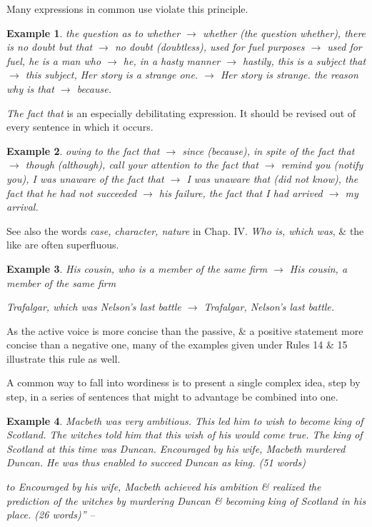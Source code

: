 \documentclass{article}
\newtheorem{example}{Example}
\begin{document}
Many expressions in common use violate this principle.
\begin{example}
	the question as to whether $\to$ whether (the question whether), there is no doubt but that $\to$ no doubt (doubtless), used for fuel purposes $\to$ used for fuel, he is a man who $\to$ he, in a hasty manner $\to$ hastily, this is a subject that $\to$ this subject, Her story is a strange one. $\to$ Her story is strange. the reason why is that $\to$ because.
\end{example}
{\it The fact that} is an especially debilitating expression. It should be revised out of every sentence in which it occurs.
\begin{example}
	owing to the fact that $\to$ since (because), in spite of the fact that $\to$ though (although), call your attention to the fact that $\to$ remind you (notify you), I was unaware of the fact that $\to$ I was unaware that (did not know), the fact that he had not succeeded $\to$ his failure, the fact that I had arrived $\to$ my arrival.
\end{example}
See also the words {\it case, character, nature} in Chap. IV. {\it Who is, which was}, \&  the like are often superfluous.
\begin{example}
	His cousin, who is a member of the same firm $\to$ His cousin, a member of the same firm
	
	Trafalgar, which was Nelson's last battle $\to$ Trafalgar, Nelson’s last battle.
\end{example}
As the active voice is more concise than the passive, \&  a positive statement more concise than a negative one, many of the examples given under Rules 14 \&  15 illustrate this rule as well.

A common way to fall into wordiness is to present a single complex idea, step by step, in a series of sentences that might to advantage be combined into one.
\begin{example}
	Macbeth was very ambitious. This led him to wish to become king of Scotland. The witches told him that this wish of his would come true. The king of Scotland at this time was Duncan. Encouraged by his wife, Macbeth murdered Duncan. He was thus enabled to succeed Duncan as king. (51 words)
	
	$to$ Encouraged by his wife, Macbeth achieved his ambition \&  realized the prediction of the witches by murdering Duncan \&  becoming king of Scotland in his place. (26 words)'' -- \cite[pp. 37--38]{Strunk_White_element_style}
\end{example}
\end{document}
